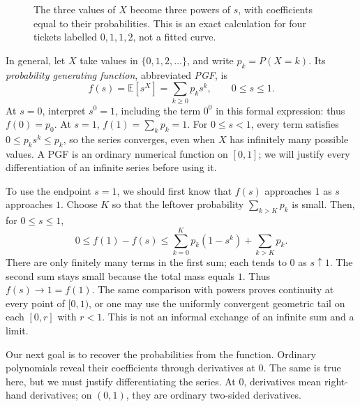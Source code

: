 \begin{figure}[ht]
\centering
{}
\caption{The three values of $X$ become three powers of $s$, with coefficients equal to their probabilities. This is an exact calculation for four tickets labelled $0,1,1,2$, not a fitted curve.}
\label{fig:lawpoly}
\end{figure}

In general, let $X$ take values in $\{0,1,2,\ldots\}$, and write $p_k=P(X=k)$. Its \emph{probability generating function}, abbreviated \emph{PGF}, is
\[
 f(s)=\mathbb E[s^X]=\sum_{k\ge0}p_k s^k,\qquad 0\le s\le1.
\]
At $s=0$, interpret $s^0=1$, including the term $0^0$ in this formal expression: thus $f(0)=p_0$. At $s=1$, $f(1)=\sum_kp_k=1$. For $0\le s<1$, every term satisfies $0\le p_ks^k\le p_k$, so the series converges, even when $X$ has infinitely many possible values. A PGF is an ordinary numerical function on $[0,1]$; we will justify every differentiation of an infinite series before using it.

To use the endpoint $s=1$, we should first know that $f(s)$ approaches $1$ as $s$ approaches $1$. Choose $K$ so that the leftover probability $\sum_{k>K}p_k$ is small. Then, for $0\le s\le1$,
\[
 0\le f(1)-f(s)\le\sum_{k=0}^Kp_k(1-s^k)+\sum_{k>K}p_k.
\]
There are only finitely many terms in the first sum; each tends to $0$ as $s\uparrow1$. The second sum stays small because the total mass equals $1$. Thus $f(s)\to1=f(1)$. The same comparison with powers proves continuity at every point of $[0,1)$, or one may use the uniformly convergent geometric tail on each $[0,r]$ with $r<1$. This is not an informal exchange of an infinite sum and a limit.

Our next goal is to recover the probabilities from the function. Ordinary polynomials reveal their coefficients through derivatives at $0$. The same is true here, but we must justify differentiating the series. At $0$, derivatives mean right-hand derivatives; on $(0,1)$, they are ordinary two-sided derivatives.

